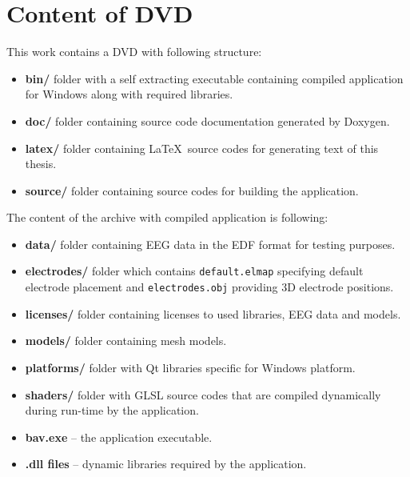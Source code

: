 \chapter{Content of DVD}
This work contains a DVD with following structure:
\begin{itemize}
	\item \textbf{bin/} folder with a self extracting executable containing compiled application for Windows along with required libraries.
	\item \textbf{doc/} folder containing source code documentation generated by Doxygen. 
	\item \textbf{latex/} folder containing \LaTeX\ source codes for generating text of this thesis.
	\item \textbf{source/} folder containing source codes for building the application.
\end{itemize}
The content of the archive with compiled application is following:
\begin{itemize}
	\item \textbf{data/} folder containing EEG data in the EDF format for testing purposes.
	\item \textbf{electrodes/} folder which contains \texttt{default.elmap} specifying default electrode placement and \texttt{electrodes.obj} providing 3D electrode positions. 
	\item \textbf{licenses/} folder containing licenses to used libraries, EEG data and models.
	\item \textbf{models/} folder containing mesh models.
	\item \textbf{platforms/} folder with Qt libraries specific for Windows platform.
	\item \textbf{shaders/} folder with GLSL source codes that are compiled dynamically during run-time by the application.
	\item \textbf{bav.exe} -- the application executable.
	\item \textbf{.dll files} -- dynamic libraries required by the application.
\end{itemize}

